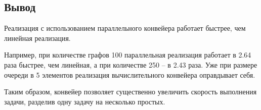 \subsection*{Вывод}
Реализация с использованием параллельного конвейера работает быстрее, чем линейная реализация.

Например, при количестве графов 100 параллельная реализация работает в 2.64 раза быстрее, чем линейная, а при количестве 250 -- в 2.43 раза. Уже при размере очереди в 5 элементов реализация вычислительного конвейера оправдывает себя.

Таким образом, конвейер позволяет существенно увеличить скорость выполнения задачи, разделив одну задачу на несколько простых.